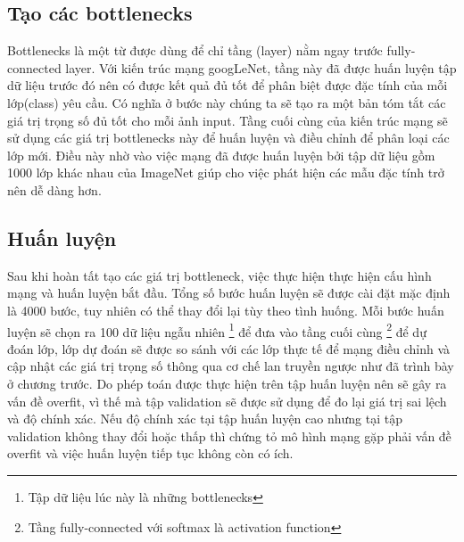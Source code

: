 	\subsection{Tạo các bottlenecks}
	
	Bottlenecks\cite{bottlenecks} là một từ được dùng để chỉ tầng (layer) nằm ngay trước fully-connected layer. Với kiến trúc mạng googLeNet, tầng này đã được huấn luyện tập dữ liệu trước đó nên có được kết quả đủ tốt để phân biệt được đặc tính của mỗi lớp(class) yêu cầu. Có nghĩa ở bước này chúng ta sẽ tạo ra một bản tóm tắt các giá trị trọng số đủ tốt cho mỗi ảnh input. Tầng cuối cùng của kiến trúc mạng sẽ sử dụng các giá trị bottlenecks này để huấn luyện và điều chỉnh để phân loại các lớp mới. Điều này nhờ vào việc mạng đã được huấn luyện bởi tập dữ liệu gồm 1000 lớp khác nhau của ImageNet giúp cho việc phát hiện các mẫu đặc tính trở nên dễ dàng hơn.
	
	\subsection{Huấn luyện}
		
	Sau khi hoàn tất tạo các giá trị bottleneck, việc thực hiện thực hiện cấu hình mạng và huấn luyện bắt đầu. Tổng số bước huấn luyện sẽ được cài đặt mặc định là 4000 bước, tuy nhiên có thể thay đổi lại tùy theo tình huống. Mỗi bước huấn luyện sẽ chọn ra 100 dữ liệu ngẫu nhiên \footnote{Tập dữ liệu lúc này là những bottlenecks} để đưa vào tầng cuối cùng \footnote{Tầng fully-connected với softmax là activation function} để dự đoán lớp, lớp dự đoán sẽ được so sánh với các lớp thực tế để mạng điều chỉnh và cập nhật các giá trị trọng số thông qua cơ chế lan truyền ngược như đã trình bày ở chương trước. Do phép toán được thực hiện trên tập huấn luyện nên sẽ  gây ra vấn đề overfit, vì thế mà tập validation sẽ được sử dụng để đo lại giá trị sai lệch và độ chính xác. Nếu độ chính xác tại tập huấn luyện cao nhưng tại tập validation không thay đổi hoặc thấp thì chứng tỏ mô hình mạng gặp phải vấn đề overfit và việc huấn luyện tiếp tục không còn có ích.
	


